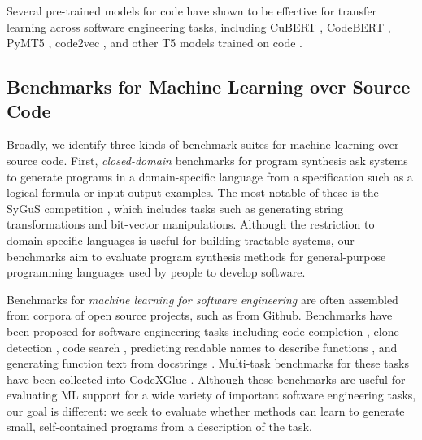 Several pre-trained models for code have shown to be effective for transfer learning across software engineering tasks, including CuBERT \citep{cubert}, CodeBERT \citep{codebert}, PyMT5 \citep{clement2020pymt5}, code2vec \citep{code2vec}, and other T5 models trained on code \citep{Mastropaolo2021-cl}.

\subsection{Benchmarks for Machine Learning over Source Code}
\label{sec:related:benchmarks}

Broadly, we identify three kinds of benchmark suites for machine learning over source code. First, \emph{closed-domain} benchmarks for program synthesis ask systems to generate programs in a domain-specific language from a specification such as a logical formula or input-output examples. The most notable of these is the SyGuS competition \citep{sygus}, which includes tasks such as generating string transformations and bit-vector manipulations. Although the restriction to domain-specific languages is useful for building tractable systems, our benchmarks aim to evaluate program synthesis methods for general-purpose programming languages used by people to develop software.

Benchmarks for \emph{machine learning for software engineering} are often assembled from corpora of open source projects, such as from Github. Benchmarks have been proposed for software engineering tasks including code completion \citep{ethpy150,massive-scale}, clone detection \citep{bigcodebench}, code search \citep{Husain2019-uv}, predicting readable names to describe functions \citep{Allamanis2016-su}, and generating function text from docstrings \citep{Iyer2018-iu}. Multi-task benchmarks for these tasks have been collected into CodeXGlue \citep{codexglue}. Although these benchmarks are useful for evaluating ML support for a wide variety of important software engineering tasks, our goal is different: we seek to evaluate whether methods can learn to generate small, self-contained programs from a description of the task.

